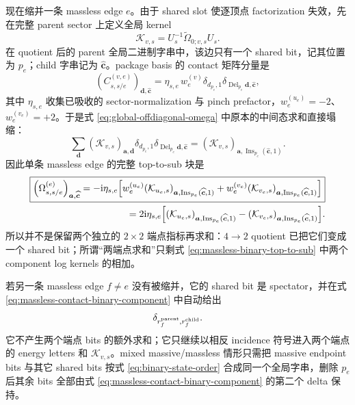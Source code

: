 \documentclass[11pt,a4paper]{ctexart}
\newcommand{\ii}{\mathrm i}
\begin{document}
现在缩并一条 massless edge $e$。由于 shared slot 使逐顶点 factorization 失效，先在完整 parent sector 上定义全局 kernel
\begin{equation}
 \mathcal K_{v,s}=U_s^{-1}\widetilde\Omega_{0;v,s}U_s.
 \label{eq:global-component-log-kernel}
\end{equation}
在 quotient 后的 parent 全局二进制字串中，该边只有一个 shared bit，记其位置为 $p_e$；child 字串记为 $\widehat{\bm c}$。package basis 的 contact 矩阵分量是
\begin{equation}
 \left(C_{s,s/e}^{(v,e)}\right)_{\bm d,\widehat{\bm c}}
 =\eta_{s,e}\,w_e^{(v)}
 \delta_{d_{p_e},1}
 \delta_{\operatorname{Del}_{p_e}\bm d,\widehat{\bm c}},
 \label{eq:massless-contact-binary-component}
\end{equation}
其中 $\eta_{s,e}$ 收集已吸收的 sector-normalization 与 pinch prefactor，$w_e^{(u_e)}=-2$、$w_e^{(v_e)}=+2$。于是式 \eqref{eq:global-offdiagonal-omega} 中原本的中间态求和直接塌缩：
\begin{equation}
 \sum_{\bm d}
 (\mathcal K_{v,s})_{\bm a,\bm d}
 \delta_{d_{p_e},1}
 \delta_{\operatorname{Del}_{p_e}\bm d,\widehat{\bm c}}
 =
 (\mathcal K_{v,s})_{\bm a,
 \operatorname{Ins}_{p_e}(\widehat{\bm c},1)}.
 \label{eq:massless-binary-sum-collapse}
\end{equation}
因此单条 massless edge 的完整 top-to-sub 块是
\begin{align}
 \boxed{
 \left(\Omega_{s,s/e}^{(e)}\right)_{\bm a,\widehat{\bm c}}
 =-\ii\eta_{s,e}\Big[
 w_e^{(u_e)}(\mathcal K_{u_e,s})_{\bm a,\operatorname{Ins}_{p_e}(\widehat{\bm c},1)}
 +w_e^{(v_e)}(\mathcal K_{v_e,s})_{\bm a,\operatorname{Ins}_{p_e}(\widehat{\bm c},1)}
 \Big]
 }
 \notag\\
 =2\ii\eta_{s,e}\Big[
 (\mathcal K_{u_e,s})_{\bm a,\operatorname{Ins}_{p_e}(\widehat{\bm c},1)}
 -(\mathcal K_{v_e,s})_{\bm a,\operatorname{Ins}_{p_e}(\widehat{\bm c},1)}
 \Big].
 \label{eq:massless-binary-top-to-sub}
\end{align}
所以并不是保留两个独立的 $2\times2$ 端点指标再求和：$4\to2$ quotient 已把它们变成一个 shared bit；所谓“两端点求和”只剩式 \eqref{eq:massless-binary-top-to-sub} 中两个 component log kernels 的相加。

若另一条 massless edge $f\neq e$ 没有被缩并，它的 shared bit 是 spectator，并在式 \eqref{eq:massless-contact-binary-component} 中自动给出
\begin{equation}
 \delta_{r_f^{\rm parent},r_f^{\rm child}}.
 \label{eq:massless-spectator-delta}
\end{equation}
它不产生两个端点 bits 的额外求和；它只继续以相反 incidence 符号进入两个端点的 energy letters 和 $\mathcal K_{v,s}$。mixed massive/massless 情形只需把 massive endpoint bits 与其它 shared bits 按式 \eqref{eq:binary-state-order} 合成同一个全局字串，删除 $p_e$ 后其余 bits 全部由式 \eqref{eq:massless-contact-binary-component} 的第二个 delta 保持。
\end{document}
